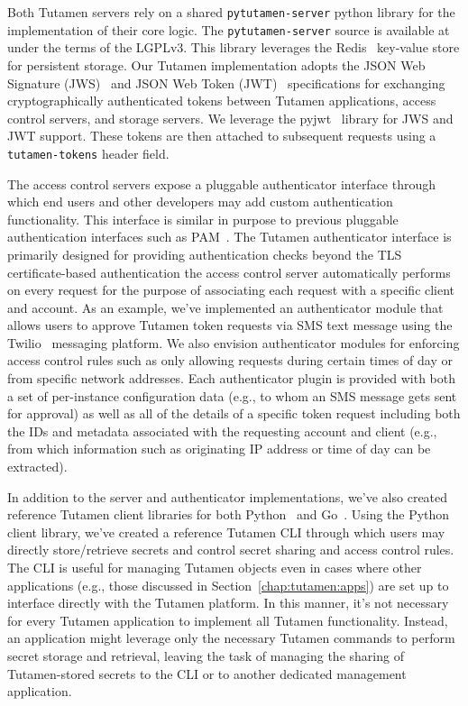 Both Tutamen servers rely on a shared \texttt{pytutamen-server} python
library for the implementation of their core logic. The
\texttt{pytutamen-server} source is available
at~\cite{src-tutamen-pytutamenserver} under the terms of the
LGPLv3. This library leverages the Redis~\cite{redis} key-value store
for persistent storage. Our Tutamen implementation adopts the JSON Web
Signature (JWS)~\cite{rfc7515} and JSON Web Token (JWT)~\cite{rfc7519}
specifications for exchanging cryptographically authenticated tokens
between Tutamen applications, access control servers, and storage
servers. We leverage the pyjwt~\cite{pyjwt} library for JWS and JWT
support. These tokens are then attached to subsequent requests using a
\texttt{tutamen-tokens} header field.

The access control servers expose a pluggable authenticator interface
through which end users and other developers may add custom
authentication functionality. This interface is similar in purpose to
previous pluggable authentication interfaces such as
PAM~\cite{samar1996}. The Tutamen authenticator interface is primarily
designed for providing authentication checks beyond the TLS
certificate-based authentication the access control server
automatically performs on every request for the purpose of associating
each request with a specific client and account. As an example, we've
implemented an authenticator module that allows users to approve
Tutamen token requests via SMS text message using the
Twilio~\cite{twilio} messaging platform. We also envision
authenticator modules for enforcing access control rules such as only
allowing requests during certain times of day or from specific network
addresses. Each authenticator plugin is provided with both a set of
per-instance configuration data (e.g., to whom an SMS message gets sent
for approval) as well as all of the details of a specific token
request including both the IDs and metadata associated with the
requesting account and client (e.g., from which information such as
originating IP address or time of day can be extracted).

In addition to the server and authenticator implementations, we've
also created reference Tutamen client libraries for both
Python~\cite{src-tutamen-pytutamen} and
Go~\cite{src-tutamen-go}. Using the Python client library, we've
created a reference Tutamen CLI through which users may directly
store/retrieve secrets and control secret sharing and access control
rules. The CLI is useful for managing Tutamen objects even in cases
where other applications (e.g., those discussed in
Section~\ref{chap:tutamen:apps}) are set up to interface directly with the
Tutamen platform. In this manner, it's not necessary for every Tutamen
application to implement all Tutamen functionality. Instead, an
application might leverage only the necessary Tutamen commands to
perform secret storage and retrieval, leaving the task of managing the
sharing of Tutamen-stored secrets to the CLI or to another dedicated
management application.

